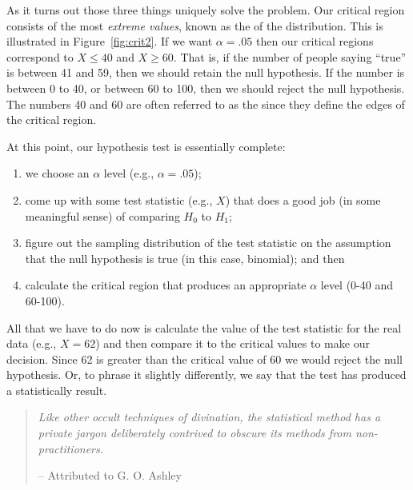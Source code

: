 As it turns out those three things uniquely solve the problem. Our critical region consists of the most {\it extreme values}, known as the  of the distribution. This is illustrated in Figure~\ref{fig:crit2}. If we want $\alpha = .05$ then our critical regions correspond to $X \leq 40$ and $X \geq 60$. That is, if the number of people saying ``true'' is between 41 and 59, then we should retain the null hypothesis. If the number is between 0 to 40, or between 60 to 100, then we should reject the null hypothesis. The numbers 40 and 60 are often referred to as the  since they define the edges of the critical region.

\pagebreak
\noindent
At this point, our hypothesis test is essentially complete:
\begin{enumerate} \itemsep -2pt
\item we choose an $\alpha$ level (e.g., $\alpha = .05$); 
\item come up with some test statistic (e.g., $X$) that does a good job (in some meaningful sense) of comparing $H_0$ to $H_1$; 
\item figure out the sampling distribution of the test statistic on the assumption that the null hypothesis is true (in this case, binomial); and then 
\item calculate the critical region that produces an appropriate $\alpha$ level (0-40 and 60-100). 
\end{enumerate}
All that we have to do now is calculate the value of the test statistic for the real data (e.g., $X = 62$) and then compare it to the critical values to make our decision. Since 62 is greater than the critical value of 60 we would reject the null hypothesis. Or, to phrase it slightly differently, we say that the test has produced a statistically  result. 



\begin{quote}
{\it Like other occult techniques of divination, the statistical method has a private jargon deliberately contrived to obscure its methods from non-practitioners.} 

\hspace*{2cm} -- Attributed to G. O. Ashley
\end{quote}

